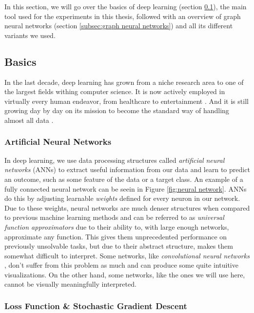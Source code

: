 \documentclass[times, utf8, diplomski, english]{fer_eng}
\begin{document}
In this section, we will go over the basics of deep learning (section \ref{subsec:basics}), the main tool used for the experiments in this thesis, followed with an overview of graph neural networks (section \ref{subsec:graph neural networks}) and all its different variants we used.

\subsection{Basics}
\label{subsec:basics}

In the last decade, deep learning has grown from a niche research area to one of the largest fields withing computer science. It is now actively employed in virtually every human endeavor, from healthcare to entertainment \cite{dl_applications}. And it is still growing day by day on its mission to become the standard way of handling almost all data \cite{dl_growth}.

\subsubsection{Artificial Neural Networks}

In deep learning, we use data processing structures called \textit{artificial neural networks} (ANNs) to extract useful information from our data and learn to predict an outcome, such as some feature of the data or a target class. An example of a fully connected neural network can be seein in Figure \ref{fig:neural network}. ANNs do this by adjusting learnable \textit{weights} defined for every neuron in our network. Due to these weights, neural networks are much denser structures when compared to previous machine learning methods and can be referred to as \textit{universal function approximators} \cite{uni_approx} due to their ability to, with large enough networks, approximate any function. This gives them unprecedented performance on previously unsolvable tasks, but due to their abstract structure, makes them somewhat difficult to interpret. Some networks, like \textit{convolutional neural networks} \cite{CNN}, don't suffer from this problem as much and can produce some quite intuitive visualizations. On the other hand, some networks, like the ones we will use here, cannot be visually meaningfully interpreted.

\subsubsection{Loss Function \& Stochastic Gradient Descent}
\label{subsubsec: loss function and stochastic gradient descent}
\end{document}
